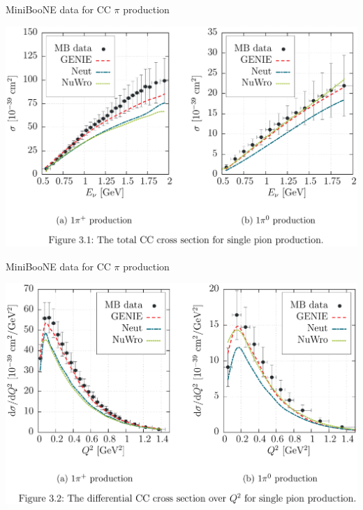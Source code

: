 \begin{wideslide}[toc=]{MiniBooNE data for CC $\pi$ production}
\null\vfill

  \includegraphics[width=\columnwidth]{figures/mbtot.eps}

\vfill\null
\end{wideslide}

\begin{wideslide}[toc=]{MiniBooNE data for CC $\pi$ production}
\null\vfill

  \includegraphics[width=\columnwidth]{figures/mbq2.eps}

\vfill\null
\end{wideslide}

